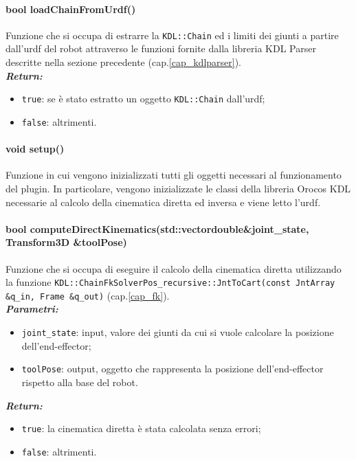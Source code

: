 \paragraph{bool loadChainFromUrdf()}
Funzione che si occupa di estrarre la \texttt{KDL::Chain} ed i limiti dei giunti a partire dall'urdf del robot attraverso le funzioni fornite dalla libreria KDL Parser descritte nella sezione precedente (cap.\ref{cap_kdlparser}).\\
\textbf{\textit{Return:}}
\begin{itemize}
	\item \texttt{true}: se è stato estratto un oggetto \texttt{KDL::Chain} dall'urdf;
	\item \texttt{false}: altrimenti.
\end{itemize}

\paragraph{void setup()}
Funzione in cui vengono inizializzati tutti gli oggetti necessari al funzionamento del plugin. In particolare, vengono inizializzate le classi della libreria Orocos KDL necessarie al calcolo della cinematica diretta ed inversa e viene letto l'urdf.


\paragraph{bool computeDirectKinematics(std::vector\tl double\tr \&joint\_state, Transform3D \&toolPose)}
Funzione che si occupa di eseguire il calcolo della cinematica diretta utilizzando la funzione \texttt{KDL::ChainFkSolverPos\_recursive::JntToCart(const JntArray \&q\_in, Frame \&q\_out)} (cap.\ref{cap_fk}).\\
\textbf{\textit{Parametri:}}
\begin{itemize}
	\item \texttt{joint\_state}: input, valore dei giunti da cui si vuole calcolare la posizione dell'end-effector; 
	\item \texttt{toolPose}: output, oggetto che rappresenta la posizione dell'end-effector rispetto alla base del robot.
\end{itemize}
\textbf{\textit{Return:}}
\begin{itemize}
	\item \texttt{true}: la cinematica diretta è stata calcolata senza errori;
	\item \texttt{false}: altrimenti.
\end{itemize}


